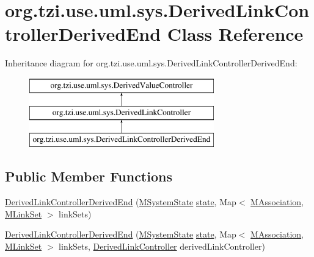 \hypertarget{classorg_1_1tzi_1_1use_1_1uml_1_1sys_1_1_derived_link_controller_derived_end}{\section{org.\-tzi.\-use.\-uml.\-sys.\-Derived\-Link\-Controller\-Derived\-End Class Reference}
\label{classorg_1_1tzi_1_1use_1_1uml_1_1sys_1_1_derived_link_controller_derived_end}
}
Inheritance diagram for org.\-tzi.\-use.\-uml.\-sys.\-Derived\-Link\-Controller\-Derived\-End\-:\begin{figure}[H]
\begin{center}
\leavevmode
\includegraphics[height=3.000000cm]{classorg_1_1tzi_1_1use_1_1uml_1_1sys_1_1_derived_link_controller_derived_end}
\end{center}
\end{figure}
\subsection*{Public Member Functions}
\begin{DoxyCompactItemize}
\item 
\hyperlink{classorg_1_1tzi_1_1use_1_1uml_1_1sys_1_1_derived_link_controller_derived_end_a61106c9c5f2caa8cc47a0bb4ad8e4485}{Derived\-Link\-Controller\-Derived\-End} (\hyperlink{classorg_1_1tzi_1_1use_1_1uml_1_1sys_1_1_m_system_state}{M\-System\-State} \hyperlink{classorg_1_1tzi_1_1use_1_1uml_1_1sys_1_1_derived_link_controller_a2870a3282e4dfeb13685cc71956abf78}{state}, Map$<$ \hyperlink{interfaceorg_1_1tzi_1_1use_1_1uml_1_1mm_1_1_m_association}{M\-Association}, \hyperlink{classorg_1_1tzi_1_1use_1_1uml_1_1sys_1_1_m_link_set}{M\-Link\-Set} $>$ link\-Sets)
\item 
\hyperlink{classorg_1_1tzi_1_1use_1_1uml_1_1sys_1_1_derived_link_controller_derived_end_ae908e37211663582d6184c13e2eeecf9}{Derived\-Link\-Controller\-Derived\-End} (\hyperlink{classorg_1_1tzi_1_1use_1_1uml_1_1sys_1_1_m_system_state}{M\-System\-State} \hyperlink{classorg_1_1tzi_1_1use_1_1uml_1_1sys_1_1_derived_link_controller_a2870a3282e4dfeb13685cc71956abf78}{state}, Map$<$ \hyperlink{interfaceorg_1_1tzi_1_1use_1_1uml_1_1mm_1_1_m_association}{M\-Association}, \hyperlink{classorg_1_1tzi_1_1use_1_1uml_1_1sys_1_1_m_link_set}{M\-Link\-Set} $>$ link\-Sets, \hyperlink{classorg_1_1tzi_1_1use_1_1uml_1_1sys_1_1_derived_link_controller}{Derived\-Link\-Controller} derived\-Link\-Controller)
\end{DoxyCompactItemize}
